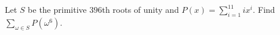 Let $S$ be the primitive $396$th roots of unity and $P(x)=\sum_{i=1}^{11}ix^i$. Find $\sum_{\omega\in S}P(\omega^6)$.
